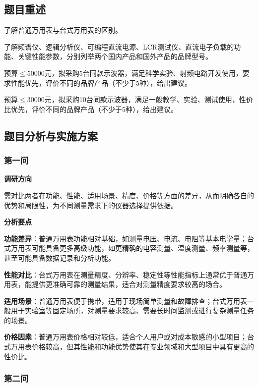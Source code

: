 \documentclass[./测控三级项目.tex]{subfiles} %
\begin{document}
	\subsection{题目重述}
		\begin{compactenum}
			\item 了解普通万用表与台式万用表的区别。
			\item 了解频谱仪、逻辑分析仪、可编程直流电源、LCR测试仪、直流电子负载的功能、关键性能参数，分别列举两个国内产品和国外产品的品牌型号。
			\item 预算$\leq$50000元，拟采购5台同款示波器，满足科学实验、射频电路开发使用，要求性能优先，评价不同的品牌产品（不少于5种），给出建议。
			\item 预算$\leq$30000元，拟采购10台同款示波器，满足一般教学、实验、测试使用，性价比优先，评价不同的品牌产品（不少于5种），给出建议。
		\end{compactenum}
		
	\subsection{题目分析与实施方案}
		\subsubsection{第一问}
			\textbf{调研方向}\par
			需对比两者在功能、性能、适用场景、精度、价格等方面的差异，从而明确各自的优势和局限性，为不同测量需求下的仪器选择提供依据。\par
			\textbf{分析要点}\par
			\textbf{功能差异}：普通万用表功能相对基础，如测量电压、电流、电阻等基本电学量；台式万用表可能具备更多高级功能，如更精确的电容测量、温度测量、频率测量等，甚至可能具备数据记录和分析功能。\par
			\textbf{性能对比}：台式万用表在测量精度、分辨率、稳定性等性能指标上通常优于普通万用表，能提供更准确可靠的测量结果，适合对测量精度要求较高的场合。\par
			\textbf{适用场景}：普通万用表便于携带，适用于现场简单测量和故障排查；台式万用表一般用于实验室等固定场所，对测量要求较高、需要长时间监测或进行复杂测量任务的场景。\par
			\textbf{价格因素}：普通万用表价格相对较低，适合个人用户或对成本敏感的小型项目；台式万用表价格较高，但其性能和功能优势使其在专业领域和大型项目中具有更高的性价比。\par
		\subsubsection{第二问}
\end{document}
